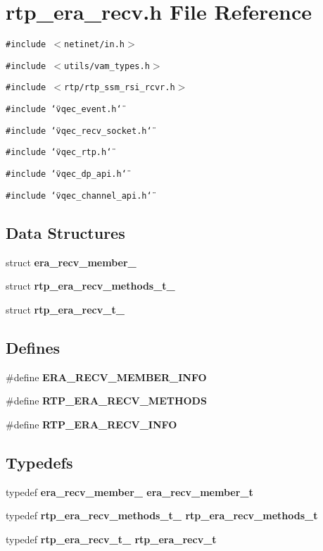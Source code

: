 \section{rtp\_\-era\_\-recv.h File Reference}
\label{rtp__era__recv_8h}
{\tt \#include $<$netinet/in.h$>$}\par
{\tt \#include $<$utils/vam\_\-types.h$>$}\par
{\tt \#include $<$rtp/rtp\_\-ssm\_\-rsi\_\-rcvr.h$>$}\par
{\tt \#include \char`\"{}vqec\_\-event.h\char`\"{}}\par
{\tt \#include \char`\"{}vqec\_\-recv\_\-socket.h\char`\"{}}\par
{\tt \#include \char`\"{}vqec\_\-rtp.h\char`\"{}}\par
{\tt \#include \char`\"{}vqec\_\-dp\_\-api.h\char`\"{}}\par
{\tt \#include \char`\"{}vqec\_\-channel\_\-api.h\char`\"{}}\par
\subsection*{Data Structures}
\begin{CompactItemize}
\item 
struct \bf{era\_\-recv\_\-member\_\-}
\item 
struct \bf{rtp\_\-era\_\-recv\_\-methods\_\-t\_\-}
\item 
struct \bf{rtp\_\-era\_\-recv\_\-t\_\-}
\end{CompactItemize}
\subsection*{Defines}
\begin{CompactItemize}
\item 
\#define \bf{ERA\_\-RECV\_\-MEMBER\_\-INFO}
\item 
\#define \bf{RTP\_\-ERA\_\-RECV\_\-METHODS}
\item 
\#define \bf{RTP\_\-ERA\_\-RECV\_\-INFO}
\end{CompactItemize}
\subsection*{Typedefs}
\begin{CompactItemize}
\item 
typedef \bf{era\_\-recv\_\-member\_\-} \bf{era\_\-recv\_\-member\_\-t}
\item 
typedef \bf{rtp\_\-era\_\-recv\_\-methods\_\-t\_\-} \bf{rtp\_\-era\_\-recv\_\-methods\_\-t}
\item 
typedef \bf{rtp\_\-era\_\-recv\_\-t\_\-} \bf{rtp\_\-era\_\-recv\_\-t}
\end{CompactItemize}
